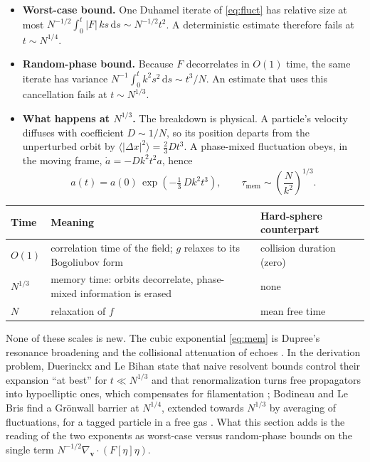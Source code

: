 \documentclass[11pt]{article}
\newcommand{\dd}{\mathrm{d}}
\newcommand{\bv}{\mathbf{v}}
\newcommand{\avg}[1]{\langle #1 \rangle}
\theoremstyle{definition}
\begin{document}
\begin{itemize}
  \item \textbf{Worst-case bound.} One Duhamel iterate of \eqref{eq:fluct}
    has relative size at most
    $N^{-1/2}\int_0^t |F|\,k s\,\dd s \sim N^{-1/2}t^2$. A deterministic
    estimate therefore fails at $t\sim N^{1/4}$.
  \item \textbf{Random-phase bound.} Because $F$ decorrelates in $O(1)$
    time, the same iterate has variance
    $N^{-1}\int_0^t k^2 s^2\,\dd s \sim t^3/N$. An estimate that uses this
    cancellation fails at $t\sim N^{1/3}$.
  \item \textbf{What happens at $N^{1/3}$.} The breakdown is physical. A
    particle's velocity diffuses with coefficient $D\sim 1/N$, so its
    position departs from the unperturbed orbit by
    $\avg{|\Delta x|^2} = \tfrac{2}{3}Dt^3$. A phase-mixed fluctuation obeys,
    in the moving frame, $\dot a = -D k^2 t^2 a$, hence
    \begin{equation}
      a(t) = a(0)\,\exp\!\left(-\tfrac{1}{3}\,D k^2 t^3\right),
      \qquad
      \tau_{\mathrm{mem}} \sim \left(\frac{N}{k^2}\right)^{1/3}.
      \label{eq:mem}
    \end{equation}
\end{itemize}

\begin{center}
\renewcommand{\arraystretch}{1.4}
\begin{tabular}{>{\raggedright}p{2.6cm}>{\raggedright}p{5.2cm}p{6.4cm}}
  Time & Meaning & Hard-sphere counterpart \\ \hline
  $O(1)$ & correlation time of the field; $g$ relaxes to its Bogoliubov form
     & collision duration (zero) \\
  $N^{1/3}$ & memory time: orbits decorrelate, phase-mixed information is erased
     & none \\
  $N$ & relaxation of $f$ & mean free time \\
\end{tabular}
\end{center}

None of these scales is new. The cubic exponential \eqref{eq:mem} is
Dupree's resonance broadening \cite{Dupree} and the collisional attenuation
of echoes \cite{ONeil}. In the derivation problem, Duerinckx and Le Bihan
state that naive resolvent bounds control their expansion ``at best'' for
$t\ll N^{1/3}$ and that renormalization turns free propagators into
hypoelliptic ones, which compensates for filamentation
\cite{DuerinckxLeBihan}; Bodineau and Le Bris find a Gr\"onwall barrier at
$N^{1/4}$, extended towards $N^{1/3}$ by averaging of fluctuations, for a
tagged particle in a free gas \cite{BodineauLeBris}. What this section adds
is the reading of the two exponents as worst-case versus random-phase bounds
on the single term $N^{-1/2}\nabla_{\bv}\cdot(F[\eta]\eta)$.
\end{document}
